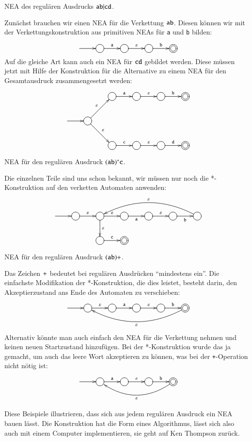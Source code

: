 \begin{beispiel}[\bf Beispiel 1] NEA des regulären Ausdrucks
${\tt ab}|{\tt cd}$.

Zunächst brauchen wir einen NEA für die Verkettung ${\tt ab}$.
Diesen können wir mit der Verkettungskonstruktion aus primitiven
NEAs für {\tt a} und {\tt b} bilden:
\[
\entrymodifiers={++[o][F]}
\xymatrix{
*+\txt{}\ar[r]
	&{}\ar[r]^{\tt a}
		&{}\ar[r]^{\varepsilon}
			&{}\ar[r]^{\tt b}
				&*++[o][F=]{}
}
\]
Auf die gleiche Art kann auch ein NEA für ${\tt cd}$ gebildet werden.
Diese müssen jetzt mit Hilfe der Konstruktion für die Alternative
zu einem NEA für den Gesamtausdruck zusammengesetzt werden:
\[
\entrymodifiers={++[o][F]}
\xymatrix{
*+\txt{}
	&*+\txt{}
		&{}\ar[r]^{\tt a}
			&{}\ar[r]^{\varepsilon}
				&{}\ar[r]^{\tt b}
					&*++[o][F=]{}
\\
*+\txt{} \ar[r]
	&{}\ar[ur]^{\varepsilon} \ar[dr]^{\varepsilon}
\\
*+\txt{}
	&*+\txt{}
		&{}\ar[r]^{\tt c}
			&{}\ar[r]^{\varepsilon}
				&{}\ar[r]^{\tt d}
					&*++[o][F=]{}
}
\]
\end{beispiel}

\begin{beispiel}[\bf Beispiel 2] NEA für den regulären Ausdruck
$({\tt ab})^*{\tt c}$.

Die einzelnen Teile sind uns schon bekannt, wir müssen nur noch
die *-Konstruktion auf den verketten Automaten anwenden:
\[
\entrymodifiers={++[o][F]}
\xymatrix{
*+\txt{}\ar[r]
	&{}\ar[r]^{\varepsilon}
		&{}\ar[r]^{\varepsilon}
			\ar[d]^{\varepsilon}
			&\ar[r]_{\tt a}
				&{}\ar[r]^{\varepsilon}
					&{}\ar[r]_{\tt b}
						&{}\ar@/_20pt/[llll]_{\varepsilon}
\\
*+\txt{}
	&*+\txt{}
		&{}\ar[r]^{\tt c}
			&*++[o][F=]{}
}
\]
\end{beispiel}

\begin{beispiel}[\bf Beispiel 3:] NEA für den regulären Ausdruck
$({\tt ab})+$.

Das Zeichen ${\tt+}$ bedeutet bei regulären Ausdrücken ``mindestens ein''.
Die einfachste Modifikation der *-Konstruktion, die dies leistet, besteht
darin, den Akzeptierzustand ans Ende des Automaten zu verschieben:
\[
\entrymodifiers={++[o][F]}
\xymatrix{
*+\txt{}\ar[r]
	&{}\ar[r]^{\varepsilon}
		&{}\ar[r]^{\tt a}
			&{}\ar[r]^{\varepsilon}
				&{}\ar[r]^{\tt b}
					&*++[o][F=]{}\ar@/^20pt/[llll]^{\varepsilon}
}
\]
Alternativ könnte man auch einfach den NEA für die Verkettung
nehmen und keinen neuen Startzustand hinzufügen.
Bei der
*-Konstruktion wurde das ja gemacht, um auch das leere Wort
akzeptieren zu können, was bei der {\tt +}-Operation nicht
nötig ist:
\[
\entrymodifiers={++[o][F]}
\xymatrix{
*+\txt{}\ar[r]
	&{}\ar[r]^{\tt a}
		&{}\ar[r]^{\varepsilon}
			&{}\ar[r]^{\tt b}
				&*++[o][F=]{}\ar@/^20pt/[lll]^{\varepsilon}
}
\]
\end{beispiel}
Diese Beispiele illustrieren, dass sich aus jedem regulären Ausdruck
ein NEA bauen lässt.
Die Konstruktion hat die Form eines Algorithmus,
lässt sich also auch mit einem Computer implementieren, sie geht
auf Ken Thompson zurück.
%

